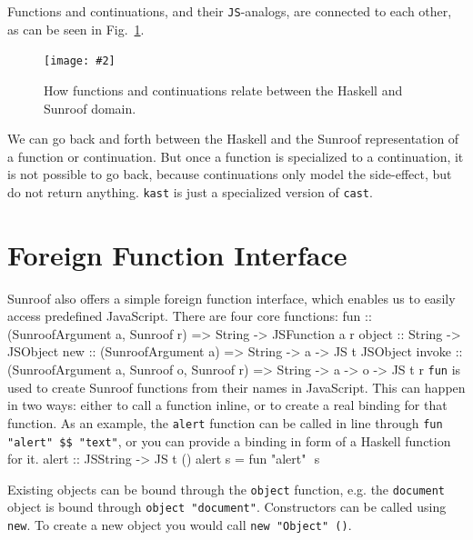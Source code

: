 \documentclass{llncs}
\newcommand{\Src}[1]{{\tt{#1}}}
\newcommand{\Figure}[3]{%
\FigureS{#1}{#2}{#3}{scale=0.55,clip=true,trim=0.45cm 0.45cm 0.45cm 0.45cm}
}
\newcommand{\FigureS}[4]{%
\begin{figure}[t]%
\begin{center}%
\texttt{[image: \#2]}%
\vspace{-0.5cm}%
\end{center}%
\caption{#3}%
\label{#1}%
\end{figure}%
}
\newenvironment{Code}{\verbatim}{\endverbatim}
\newcommand{\FigRef}[1]{Fig.~\ref{#1}}
\begin{document}
Functions and continuations, and their \Src{JS}-analogs,
are connected  to each other, as can be seen in \FigRef{fig:func-cont}.
\Figure%
{fig:func-cont}%
{figures/sunroof-func-cont.pdf}%
{How functions and continuations relate between the Haskell and Sunroof domain.}%
We can go back and forth between the Haskell and the Sunroof
representation of a function or continuation. But once a function
is specialized to a continuation, it is not possible to go back,
because continuations only model the side-effect, but do 
not return anything. \Src{kast} is just a specialized version of \Src{cast}.




\section{Foreign Function Interface}
\label{sec:ffi}

Sunroof also offers a simple foreign function interface, 
which enables us to easily 
access predefined JavaScript. There are four core functions:
\begin{Code}
fun    :: (SunroofArgument a, Sunroof r) 
       => String -> JSFunction a r
object :: String -> JSObject
new    :: (SunroofArgument a) 
       => String -> a -> JS t JSObject
invoke :: (SunroofArgument a, Sunroof o, Sunroof r) 
       => String -> a -> o -> JS t r
\end{Code}
\Src{fun} is used to create Sunroof functions from their names in JavaScript.
This can happen in two ways: either to call a function inline, or to 
create a real binding for that function. As an example, 
the \Src{alert} function can be called in line through \Src{fun "alert" \$\$ "text"},
or you can provide a binding in form of a Haskell function for it.
\begin{Code}
alert :: JSString -> JS t ()
alert s = fun "alert" $$ s
\end{Code}

Existing objects can be bound through the \Src{object} function, e.g.
the \Src{document} object is bound through \Src{object "document"}.
Constructors can be called using \Src{new}. To create a new
object you would call \Src{new "Object" ()}.
\end{document}
